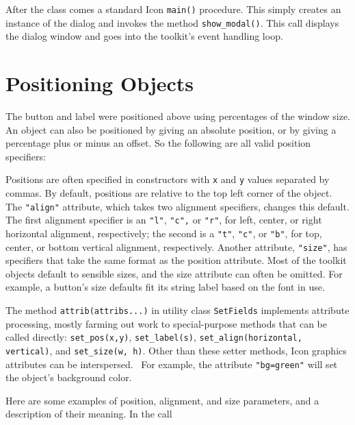 After the class comes a standard Icon \texttt{main()} procedure. This
simply creates an instance of the dialog and invokes the method
\texttt{show\_modal()}.
This call displays the dialog window and goes into the
toolkit's event handling loop. 

\section{Positioning Objects}

The button and label were positioned above using
percentages of the window size. An object can also be
positioned by giving an absolute position, or by giving a percentage
plus or minus an offset. So the following are all valid position
specifiers:


Positions are often specified in constructors
with \texttt{x} and \texttt{y} values separated by commas. By default,
positions are relative to the top left corner of the object.
The \texttt{"align"}
attribute, which takes two alignment specifiers, changes this
default. The first alignment specifier is an
\texttt{"l"},
\texttt{"c"}\texttt{,} or
\texttt{"r"}, for left, center, or right
horizontal alignment, respectively; the second is a
\texttt{"t"},
\texttt{"c"}, or
\texttt{"b"}, for top, center, or bottom
vertical alignment, respectively. Another attribute,
\texttt{"size"}, has specifiers that take the
same format as the position attribute. Most of the toolkit objects
default to sensible sizes, and the size attribute can often be omitted.
For example, a button's size defaults fit its string label
based on the font in use.

The method \texttt{attrib(attribs...)} in utility class
\texttt{SetFields} implements attribute
processing, mostly farming out work to special-purpose methods
that can be called directly: \texttt{set\_pos(x,y)},
\texttt{set\_label(s)}, \texttt{set\_align(horizontal, vertical)}, and
\texttt{set\_size(w, }\texttt{h)}. Other than these setter methods,
Icon graphics attributes can be interspersed. \ For example, the
attribute \texttt{"bg=green"} will set the
object's background color.

Here are some examples of position, alignment, and size parameters, and
a description of their meaning. In the call

